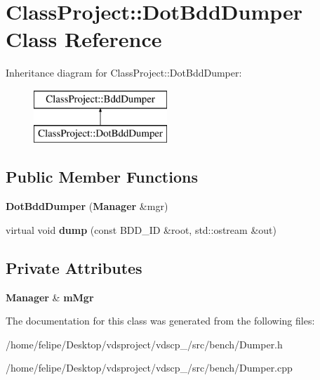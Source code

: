 \section{Class\+Project\+:\+:Dot\+Bdd\+Dumper Class Reference}
\label{classClassProject_1_1DotBddDumper}
Inheritance diagram for Class\+Project\+:\+:Dot\+Bdd\+Dumper\+:\begin{figure}[H]
\begin{center}
\leavevmode
\includegraphics[height=2.000000cm]{classClassProject_1_1DotBddDumper}
\end{center}
\end{figure}
\subsection*{Public Member Functions}
\begin{DoxyCompactItemize}
\item 
{\bfseries Dot\+Bdd\+Dumper} ({\bf Manager} \&mgr)\label{classClassProject_1_1DotBddDumper_ae6ea6f970ccdff61558df2e2d5d71591}

\item 
virtual void {\bfseries dump} (const B\+D\+D\+\_\+\+ID \&root, std\+::ostream \&out)\label{classClassProject_1_1DotBddDumper_abcef13e93836b3827e1903a6ad6bed00}

\end{DoxyCompactItemize}
\subsection*{Private Attributes}
\begin{DoxyCompactItemize}
\item 
{\bf Manager} \& {\bfseries m\+Mgr}\label{classClassProject_1_1DotBddDumper_a6b9830ecab53e55ce3cf80f434c03cee}

\end{DoxyCompactItemize}


The documentation for this class was generated from the following files\+:\begin{DoxyCompactItemize}
\item 
/home/felipe/\+Desktop/vdsproject/vdscp\+\_/src/bench/Dumper.\+h\item 
/home/felipe/\+Desktop/vdsproject/vdscp\+\_/src/bench/Dumper.\+cpp\end{DoxyCompactItemize}

